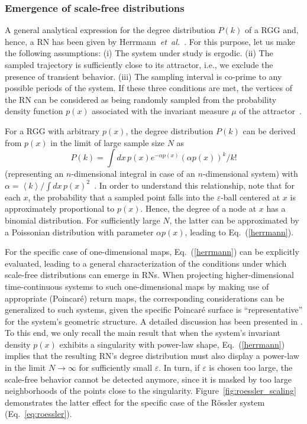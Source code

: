 \documentclass[graybox]{svmult}
\begin{document}
\subsubsection{Emergence of scale-free distributions}\label{sec:scaling}

A general analytical expression for the degree distribution $P(k)$ of a RGG and, hence, a RN has been given by Herrmann~\textit{et~al.}~\cite{Herrmann2003}. For this purpose, let us make the following assumptions: (i) The system under study is ergodic. (ii) The sampled trajectory is sufficiently close to its attractor, i.e., we exclude the presence of transient behavior. (iii) The sampling interval is co-prime to any possible periods of the system. If these three conditions are met, the vertices of the RN can be considered as being randomly sampled from the probability density function $p(x)$ associated with the invariant measure $\mu$ of the attractor~\cite{Eckmann1985}. 

For a RGG with arbitrary $p(x)$, the degree distribution $P(k)$ can be derived from $p(x)$ in the limit of large sample size $N$ as
\begin{equation}\label{herrmann}
  P(k) = \int dx\,p(x) e^{-\alpha p(x)}(\alpha p(x))^k/k!
\end{equation}
(representing an $n$-dimensional integral in case of an $n$-dimensional system) with $\alpha = \left<k\right> / \int dx\,p(x)^2$~\cite{Herrmann2003}. In order to understand this relationship, note that for each $x$, the probability that a sampled point falls into the $\varepsilon$-ball centered at $x$ is approximately proportional to $p(x)$. Hence, the degree of a node at $x$ has a binomial distribution. For sufficiently large $N$, the latter can be approximated by a Poissonian distribution with parameter $\alpha p(x)$, leading to Eq.~(\ref{herrmann}).

For the specific case of one-dimensional maps, Eq.~(\ref{herrmann}) can be explicitly evaluated, leading to a general characterization of the conditions under which scale-free distributions can emerge in RNs. When projecting higher-dimensional time-continuous systems to such one-dimensional maps by making use of appropriate (Poincar\'e) return maps, the corresponding considerations can be generalized to such systems, given the specific Poincar\'e surface is ``representative'' for the system's geometric structure. A detailed discussion has been presented in \cite{Zou2012EPL}. To this end,  we only recall the main result that when the system's invariant density $p(x)$ exhibits a singularity with power-law shape, Eq.~(\ref{herrmann}) implies that the resulting RN's degree distribution must also display a power-law in the limit $N\to\infty$ for sufficiently small $\varepsilon$. In turn, if $\varepsilon$ is chosen too large, the scale-free behavior cannot be detected anymore, since it is masked by too large neighborhoods of the points close to the singularity. Figure~\ref{fig:roessler_scaling} demonstrates the latter effect for the specific case of the R\"ossler system (Eq.~\ref{eq:roessler}).
\end{document}
